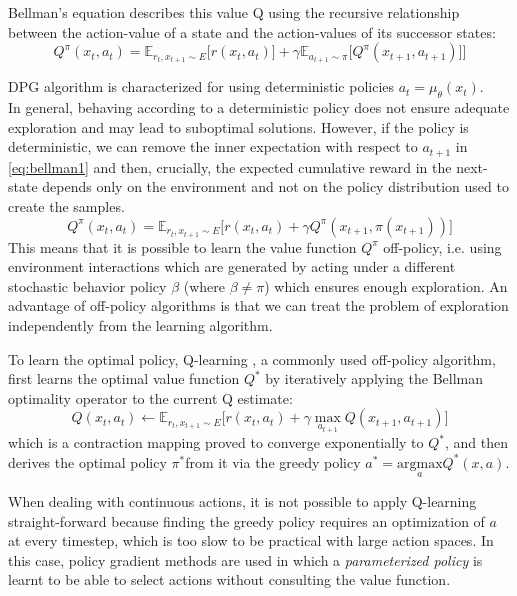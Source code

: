 Bellman's equation describes this value Q using the 
recursive relationship between the action-value of a state and the action-values of its
successor states:
\begin{equation}
    Q^\pi(x_t,a_t) = \mathbb E_{r_t,x_{t+1} \sim E}\Big[ r(x_t,a_t)] + \gamma \mathbb E_{a_{t+1}\sim \pi}\big[Q^\pi(x_{t+1},a_{t+1})\big]\Big] \label{eq:bellman1}
\end{equation}


DPG algorithm \citep{silver2014b} is characterized for using deterministic policies $a_t=\mu_{\theta}(x_t)$.\\
In general, behaving according to a deterministic policy does not ensure adequate exploration
and may lead to suboptimal solutions. 
However, if the policy is deterministic, we can remove the inner expectation with respect 
to $a_{t+1}$ in \ref{eq:bellman1} and then, crucially, the expected cumulative reward in the next-state 
depends only on the environment and not on the policy distribution used to create the samples.
\begin{equation}
    Q^\pi(x_t,a_t) = \mathbb E_{r_t,x_{t+1} \sim E}\Big[ r(x_t,a_t) + \gamma Q^\pi(x_{t+1},\pi(x_{t+1}))\Big]
\end{equation}
\label{par:offpolicy}
This means that it is possible to learn the value function
$Q^\pi$ off-policy, i.e. using environment interactions which are generated by acting
under a different stochastic
behavior policy $\beta$ (where $\beta \neq \pi$) which ensures enough exploration.
An advantage of off-policy algorithms is that we can treat the problem of exploration
independently from the learning algorithm.

To learn the optimal policy, Q-learning \cite{Watkins1992}, a commonly used off-policy algorithm, first learns the optimal 
value function $Q^*$ by iteratively applying the Bellman optimality operator to the current Q estimate:
\begin{equation}
    Q(x_t,a_t) \leftarrow \mathbb E_{r_t,x_{t+1} \sim E}\Big[ r(x_t,a_t) + \gamma \underset{a_{t+1}} \max Q(x_{t+1},a_{t+1})\Big]
\end{equation}
which is a contraction mapping proved to converge exponentially to $Q^*$, and then
derives the optimal policy $\pi^*$from it via the greedy policy $a^*=\underset{a}{\text{argmax}} Q^*(x,a)$.

When dealing with continuous actions, it is not possible to apply Q-learning
straight-forward because finding the greedy policy requires an optimization of $a$ at 
every timestep, which is too slow to be practical with large action spaces.
In this case, policy gradient methods are used in which a \textit{parameterized policy} is learnt 
to be able to select actions without consulting the value function.


